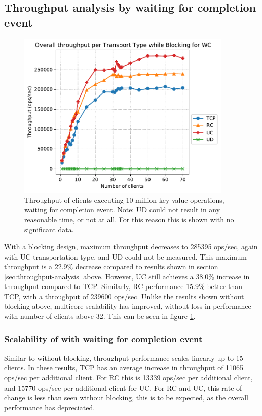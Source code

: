 \subsection{Throughput analysis by waiting for completion event}
\begin{figure}
    \centering
    \includegraphics[height=8cm]{figures/PDF/Throughput_70_blocking}
    \caption[Throughput of clients executing 10 million key-value operations, waiting for completion event.]{Throughput of clients executing 10 million key-value operations, waiting for completion event. Note: UD could not result in any reasonable time, or not at all. For this reason this is shown with no significant data.}
    \label{fig:throughput-70-block}
\end{figure}

With a blocking design, maximum throughput decreases to 285395 ops/sec, again with UC transportation type, and UD could not be measured.
This maximum throughput is a 22.9\% decrease compared to results shown in section \ref{sec:throughput-analysis} above.
However, UC still achieves a 38.0\% increase in throughput compared to TCP.
Similarly, RC performance 15.9\% better than TCP, with a throughput of 239600 ops/sec.
Unlike the results shown without blocking above, multicore scalability has improved, without loss in performance with number of clients above 32.
This can be seen in figure \ref{fig:throughput-70-block}.

\subsubsection{Scalability of with waiting for completion event}
Similar to without blocking, throughput performance scales linearly up to 15 clients.
In these results, TCP has an average increase in throughput of 11065 ops/sec per additional client.
For RC this is 13339 ops/sec per additional client, and 15770 ops/sec per additional client for UC.
For RC and UC, this rate of change is less than seen without blocking, this is to be expected, as the overall performance has depreciated.

